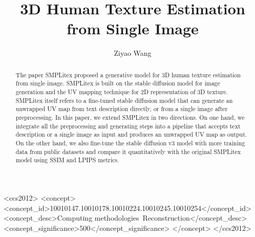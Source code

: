 \documentclass[acmtog]{acmart}
\begin{document}
\title{3D Human Texture Estimation from Single Image}

\author{Ziyao Wang}

\renewcommand{\shortauthors}{Ziyao Wang}

\begin{abstract}
  The paper SMPLitex \cite{casas2023smplitex} proposed a generative model for 3D human texture estimation from single image. SMPLitex is built on the stable diffusion model for image generation and the UV mapping technique for 2D representation of 3D texture. SMPLitex itself refers to a fine-tuned stable diffusion model that can generate an unwrapped UV map from text description directly, or from a single image after preprocessing. In this paper, we extend SMPLitex in two directions. On one hand, we integrate all the preprocessing and generating steps into a pipeline that accepts text description or a single image as input and produces an unwrapped UV map as output. On the other hand, we also fine-tune the stable diffusion v3 model with more training data from public datasets and compare it quantitatively with the original SMPLitex model using SSIM and LPIPS metrics.
\end{abstract}

\begin{CCSXML}
  <ccs2012>
  <concept>
  <concept_id>10010147.10010178.10010224.10010245.10010254</concept_id>
  <concept_desc>Computing methodologies~Reconstruction</concept_desc>
  <concept_significance>500</concept_significance>
  </concept>
  </ccs2012>
\end{CCSXML}
\end{document}
